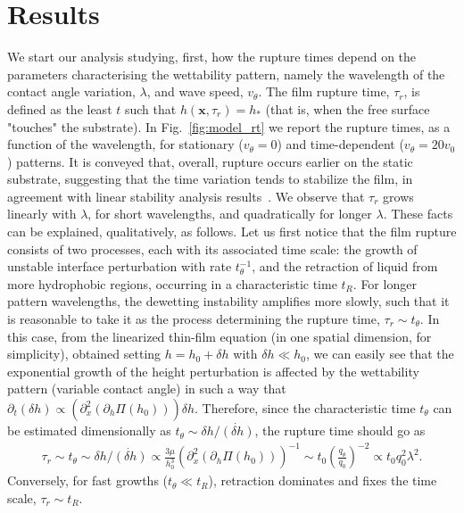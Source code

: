 \section{Results} 
We start our analysis studying, first, how the rupture times depend on the parameters characterising the wettability pattern, namely the wavelength of the contact angle variation, $\lambda$, and wave speed, $v_{\theta}$.
The film rupture time, $\tau_r$, is defined as the least $t$ such that $h(\mathbf{x},\tau_r)=h_{\ast}$ (that is, when the free surface "touches" the substrate).
In Fig.~\ref{fig:model_rt} we report the rupture times, as a function of the wavelength, for stationary ($v_{\theta}=0$) and time-dependent ($v_{\theta}=20 v_0$) patterns. 
It is conveyed that, overall, rupture occurs earlier on the static substrate, suggesting that the time variation tends to stabilize the film, in agreement with linear stability analysis results~\cite{sumanDynamicsThinLiquid2006}.
We observe that $\tau_r$ grows linearly with $\lambda$, for short wavelengths, and quadratically for longer $\lambda$.
These facts can be explained, qualitatively, as follows. 
Let us first notice that the film rupture consists of two processes, each with its associated time scale: the growth of unstable interface perturbation with rate $t_{\theta}^{-1}$, and the retraction of liquid from more hydrophobic regions, occurring in a characteristic time $t_R$. 
For longer pattern wavelengths, the dewetting instability amplifies more slowly, such that it is reasonable to take it as the process determining the rupture time, $\tau_r \sim t_{\theta}$.
In this case, from the linearized thin-film equation (in one spatial dimension, for simplicity), obtained setting $h=h_0 + \delta h$ with $\delta h \ll h_0$, we can easily see that the exponential growth of the height perturbation is affected by the wettability pattern (variable contact angle) in such a way that $\partial_t (\delta h) \propto (\partial_x^2 (\partial_h\Pi(h_0))) \delta h$. 
Therefore, since the characteristic time $t_{\theta}$ can be estimated dimensionally as $t_{\theta} \sim \delta h/\dot{(\delta h)}$, the rupture time should go as
\begin{multline}\label{eq:taur_l2}
    \tau_r \sim t_{\theta} \sim  \delta h/\dot{(\delta h)} \propto \frac{3\mu}{h_0^3}(\partial_x^2 (\partial_h\Pi (h_0)))^{-1} \sim t_0 \left(\frac{q_{\theta}}{q_0}\right)^{-2} \propto t_0 q_0^2 \lambda^2.
\end{multline}
Conversely, for fast growths ($t_{\theta} \ll t_R$), retraction dominates and fixes the time scale, $\tau_r \sim t_R$. 
